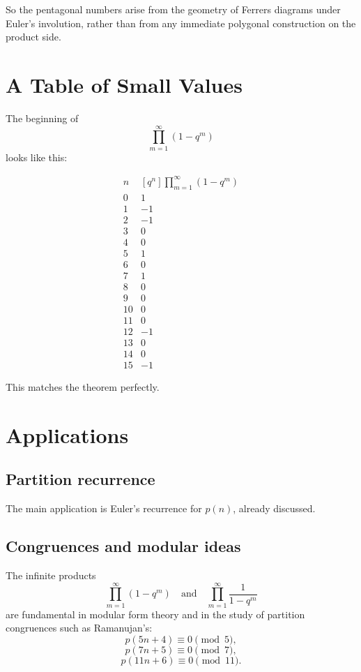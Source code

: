 \documentclass[11pt]{article}
\theoremstyle{definition}
\theoremstyle{remark}
\begin{document}
	So the pentagonal numbers arise from the geometry of Ferrers diagrams under Euler's involution, rather than from any immediate polygonal construction on the product side.
	
	\section{A Table of Small Values}
	
	The beginning of
	\[
	\prod_{m=1}^{\infty}(1-q^m)
	\]
	looks like this:
	
	\[
	\begin{array}{c|c}
		n & [q^n]\prod_{m=1}^{\infty}(1-q^m)\\
		\hline
		0 & 1\\
		1 & -1\\
		2 & -1\\
		3 & 0\\
		4 & 0\\
		5 & 1\\
		6 & 0\\
		7 & 1\\
		8 & 0\\
		9 & 0\\
		10 & 0\\
		11 & 0\\
		12 & -1\\
		13 & 0\\
		14 & 0\\
		15 & -1
	\end{array}
	\]
	
	This matches the theorem perfectly.
	
	\section{Applications}
	
	\subsection{Partition recurrence}
	
	The main application is Euler's recurrence for \(p(n)\), already discussed.
	
	\subsection{Congruences and modular ideas}
	
	The infinite products
	\[
	\prod_{m=1}^{\infty}(1-q^m)
	\quad\text{and}\quad
	\prod_{m=1}^{\infty}\frac{1}{1-q^m}
	\]
	are fundamental in modular form theory and in the study of partition congruences such as Ramanujan's:
	\[
	p(5n+4)\equiv 0 \pmod 5,
	\]
	\[
	p(7n+5)\equiv 0 \pmod 7,
	\]
	\[
	p(11n+6)\equiv 0 \pmod{11}.
	\]
	
\end{document}
